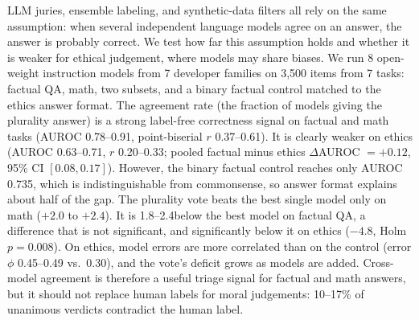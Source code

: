 LLM juries, ensemble labeling, and synthetic-data filters all rely on the same assumption: when several independent language models agree on an answer, the answer is probably correct.
We test how far this assumption holds and whether it is weaker for ethical judgement, where models may share biases.
We run 8 open-weight instruction models from 7 developer families on 3,500 items from 7 tasks: factual QA, math, two \ethics subsets, and a binary factual control matched to the ethics answer format.
The agreement rate (the fraction of models giving the plurality answer) is a strong label-free correctness signal on factual and math tasks (AUROC 0.78--0.91, point-biserial $r$ 0.37--0.61).
It is clearly weaker on ethics (AUROC 0.63--0.71, $r$ 0.20--0.33; pooled factual minus ethics $\Delta$AUROC $=+0.12$, 95\% CI $[0.08, 0.17]$).
However, the binary factual control reaches only AUROC 0.735, which is indistinguishable from \ethics commonsense, so answer format explains about half of the gap.
The plurality vote beats the best single model only on math ($+2.0$ to $+2.4$\pp). It is 1.8--2.4\pp below the best model on factual QA, a difference that is not significant, and significantly below it on ethics ($-4.8$\pp, Holm $p=0.008$).
On ethics, model errors are more correlated than on the control (error $\phi$ 0.45--0.49 vs.\ 0.30), and the vote's deficit grows as models are added.
Cross-model agreement is therefore a useful triage signal for factual and math answers, but it should not replace human labels for moral judgements: 10--17\% of unanimous \ethics verdicts contradict the human label.
